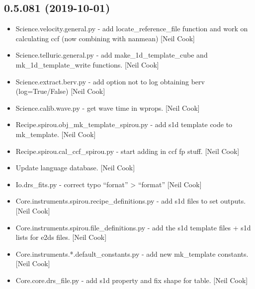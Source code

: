 \documentclass[a4paper,10pt,english]{report}
\begin{document}
\subsection{0.5.081 (2019-10-01)}
\label{\detokenize{misc/changelog:id60}}\begin{itemize}
\item {} 
Science.velocity.general.py - add locate\_reference\_file function and
work on calculating ccf (now combining with nanmean) {[}Neil Cook{]}

\item {} 
Science.telluric.general.py - add make\_1d\_template\_cube and
mk\_1d\_template\_write functions. {[}Neil Cook{]}

\item {} 
Science.extract.berv.py - add option not to log obtaining berv
(log=True/False) {[}Neil Cook{]}

\item {} 
Science.calib.wave.py - get wave time in wprops. {[}Neil Cook{]}

\item {} 
Recipe.spirou.obj\_mk\_template\_spirou.py - add s1d template code to
mk\_template. {[}Neil Cook{]}

\item {} 
Recipe.spirou.cal\_ccf\_spirou.py - start adding in ccf fp stuff. {[}Neil
Cook{]}

\item {} 
Update language database. {[}Neil Cook{]}

\item {} 
Io.drs\_fits.py - correct typo “fornat” \textendash{}\textgreater{} “format” {[}Neil Cook{]}

\item {} 
Core.instruments.spirou.recipe\_definitions.py - add s1d files to set
outputs. {[}Neil Cook{]}

\item {} 
Core.instruments.spirou.file\_definitions.py - add the s1d template
files + s1d lists for e2ds files. {[}Neil Cook{]}

\item {} 
Core.instruments.*.default\_constants.py - add new mk\_template
constants. {[}Neil Cook{]}

\item {} 
Core.core.drs\_file.py - add s1d property and fix shape for table.
{[}Neil Cook{]}

\end{itemize}
\end{document}

